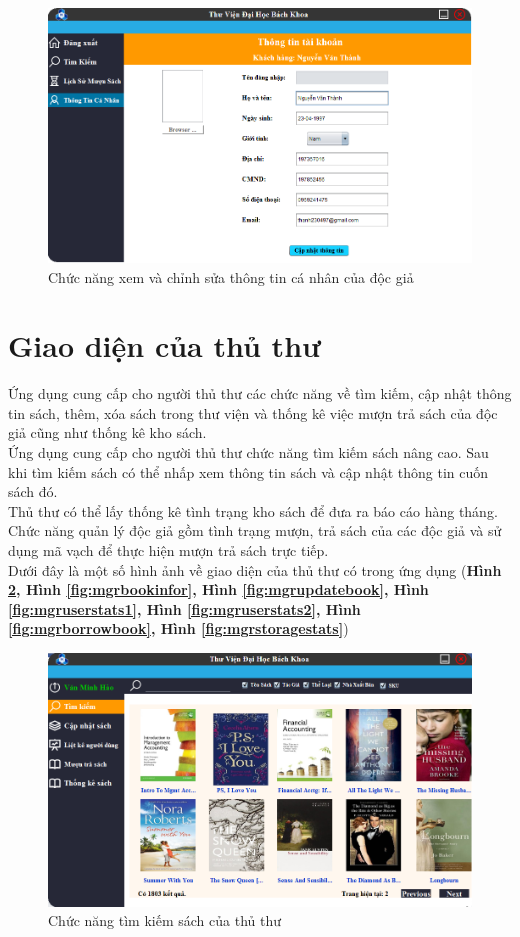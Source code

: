 \documentclass[12pt]{report}
\begin{document}
						\begin{figure}
						\centering
						\includegraphics[scale=0.65]{images/inforreader.png}
						\caption{Chức năng xem và chỉnh sửa thông tin cá nhân của độc giả}
						\label{fig:readerinfor}
						\end{figure}
			\section{Giao diện của thủ thư}
			Ứng dụng cung cấp cho người thủ thư các chức năng về tìm kiếm, cập nhật thông tin sách, thêm, xóa sách trong thư viện và thống kê việc mượn trả sách của độc giả cũng như thống kê kho sách.\\
			Ứng dụng cung cấp cho người thủ thư chức năng tìm kiếm sách nâng cao. Sau khi tìm kiếm sách có thể nhấp xem thông tin sách và cập nhật thông tin cuốn sách đó.\\
			Thủ thư có thể lấy thống kê tình trạng kho sách để đưa ra báo cáo hàng tháng.\\
			Chức năng quản lý độc giả gồm tình trạng mượn, trả sách của các độc giả và sử dụng mã vạch để thực hiện mượn trả sách trực tiếp.\\
			Dưới đây là một số hình ảnh về giao diện của thủ thư có trong ứng dụng (\textbf{Hình \ref{fig:mgrsearch}, Hình \ref{fig:mgrbookinfor}, Hình \ref{fig:mgrupdatebook}, Hình \ref{fig:mgruserstats1}, Hình \ref{fig:mgruserstats2}, Hình \ref{fig:mgrborrowbook}, Hình \ref{fig:mgrstoragestats}})
						\begin{figure}
						\centering
						\includegraphics[scale=0.65]{images/mgr1.png}
						\caption{Chức năng tìm kiếm sách của thủ thư}
						\label{fig:mgrsearch}
						\end{figure}
						
\end{document}
